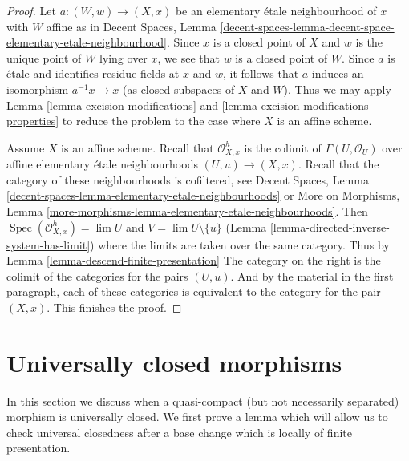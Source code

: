 \documentclass{stacks-project}
\theoremstyle{plain}
\theoremstyle{definition}
\theoremstyle{remark}
\numberwithin{equation}{subsection}
\def\lim{\mathop{\mathrm{lim}}\nolimits}
\def\Spec{\mathop{\mathrm{Spec}}}
\begin{document}
\begin{proof}
Let $a : (W, w) \to (X, x)$ be an elementary \'etale neighbourhood of $x$
with $W$ affine as in
Decent Spaces, Lemma
\ref{decent-spaces-lemma-decent-space-elementary-etale-neighbourhood}.
Since $x$ is a closed point of $X$ and $w$ is the unique point of $W$
lying over $x$, we see that $w$ is a closed point of $W$. Since $a$
is \'etale and identifies residue fields at $x$ and $w$, it
follows that $a$ induces an isomorphism $a^{-1}x \to x$ (as closed
subspaces of $X$ and $W$). Thus we may apply
Lemma \ref{lemma-excision-modifications} and
\ref{lemma-excision-modifications-properties}
to reduce the problem to the case where $X$ is an affine scheme.

\medskip\noindent
Assume $X$ is an affine scheme. Recall that $\mathcal{O}_{X, x}^h$
is the colimit of $\Gamma(U, \mathcal{O}_U)$ over affine
elementary \'etale neighbourhoods $(U, u) \to (X, x)$.
Recall that the category of these neighbourhoods is
cofiltered, see Decent Spaces, Lemma
\ref{decent-spaces-lemma-elementary-etale-neighbourhoods} or
More on Morphisms, Lemma
\ref{more-morphisms-lemma-elementary-etale-neighbourhoods}.
Then $\Spec(\mathcal{O}_{X, x}^h) = \lim U$ and
$V = \lim U \setminus \{u\}$
(Lemma \ref{lemma-directed-inverse-system-has-limit})
where the limits are taken over the same category. Thus by
Lemma \ref{lemma-descend-finite-presentation}
The category on the right is the colimit of the categories
for the pairs $(U, u)$. And by the material in the first
paragraph, each of these categories is equivalent to the
category for the pair $(X, x)$. This finishes the proof.
\end{proof}






\section{Universally closed morphisms}
\label{section-universally-closed}

\noindent
In this section we discuss when a quasi-compact (but not necessarily
separated) morphism is universally closed. We first prove a lemma which
will allow us to check universal closedness after a base change
which is locally of finite presentation.
\end{document}
